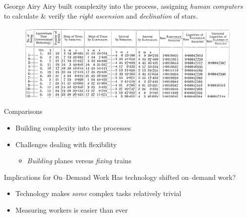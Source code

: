 \documentclass[presentation]{subfiles}
\begin{document}
\begin{frame}{George Airy}
    Airy built complexity into the process, assigning \emph{human computers} 
    to calculate \& verify the \emph{right ascension} and \emph{declination} of stars.

    \begin{figure}
    \includegraphics[width=\textwidth]{figures/complexity/pw_literature/airy.png}
    \end{figure}
\end{frame}






\begin{frame}{Comparisons}

\begin{itemize}
    \item<+-> Building complexity into the processes
  \item Challenges dealing with flexibility
  \begin{itemize}
    \item \emph{Building} planes versus \emph{fixing} trains
  \end{itemize}
\end{itemize}
\end{frame}

\begin{frame}{Implications for On--Demand Work}
  Has technology shifted on--demand work?
    \begin{itemize}
      \item Technology makes \emph{some} complex tasks relatively trivial
      \item Measuring workers is easier than ever
    \end{itemize}
\end{frame}
\end{document}
